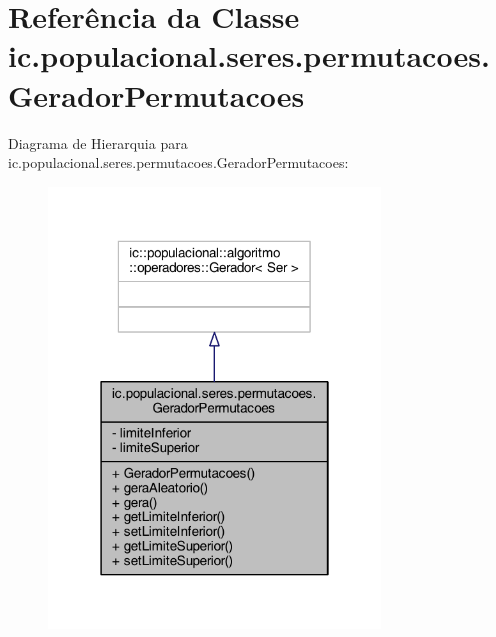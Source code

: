 \hypertarget{classic_1_1populacional_1_1seres_1_1permutacoes_1_1_gerador_permutacoes}{\section{Referência da Classe ic.\-populacional.\-seres.\-permutacoes.\-Gerador\-Permutacoes}
\label{classic_1_1populacional_1_1seres_1_1permutacoes_1_1_gerador_permutacoes}
}


Diagrama de Hierarquia para ic.\-populacional.\-seres.\-permutacoes.\-Gerador\-Permutacoes\-:
\nopagebreak
\begin{figure}[H]
\begin{center}
\leavevmode
\includegraphics[width=250pt]{classic_1_1populacional_1_1seres_1_1permutacoes_1_1_gerador_permutacoes__inherit__graph}
\end{center}
\end{figure}


